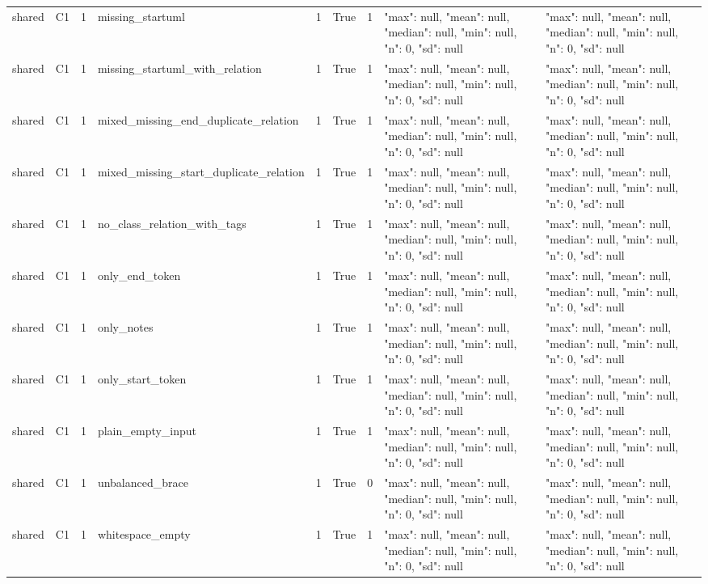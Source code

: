 \begin{tabular}{lllllllll}
shared & C1 & 1 & missing\_startuml & 1 & True & 1 & {"max": null, "mean": null, "median": null, "min": null, "n": 0, "sd": null} & {"max": null, "mean": null, "median": null, "min": null, "n": 0, "sd": null} \\
shared & C1 & 1 & missing\_startuml\_with\_relation & 1 & True & 1 & {"max": null, "mean": null, "median": null, "min": null, "n": 0, "sd": null} & {"max": null, "mean": null, "median": null, "min": null, "n": 0, "sd": null} \\
shared & C1 & 1 & mixed\_missing\_end\_duplicate\_relation & 1 & True & 1 & {"max": null, "mean": null, "median": null, "min": null, "n": 0, "sd": null} & {"max": null, "mean": null, "median": null, "min": null, "n": 0, "sd": null} \\
shared & C1 & 1 & mixed\_missing\_start\_duplicate\_relation & 1 & True & 1 & {"max": null, "mean": null, "median": null, "min": null, "n": 0, "sd": null} & {"max": null, "mean": null, "median": null, "min": null, "n": 0, "sd": null} \\
shared & C1 & 1 & no\_class\_relation\_with\_tags & 1 & True & 1 & {"max": null, "mean": null, "median": null, "min": null, "n": 0, "sd": null} & {"max": null, "mean": null, "median": null, "min": null, "n": 0, "sd": null} \\
shared & C1 & 1 & only\_end\_token & 1 & True & 1 & {"max": null, "mean": null, "median": null, "min": null, "n": 0, "sd": null} & {"max": null, "mean": null, "median": null, "min": null, "n": 0, "sd": null} \\
shared & C1 & 1 & only\_notes & 1 & True & 1 & {"max": null, "mean": null, "median": null, "min": null, "n": 0, "sd": null} & {"max": null, "mean": null, "median": null, "min": null, "n": 0, "sd": null} \\
shared & C1 & 1 & only\_start\_token & 1 & True & 1 & {"max": null, "mean": null, "median": null, "min": null, "n": 0, "sd": null} & {"max": null, "mean": null, "median": null, "min": null, "n": 0, "sd": null} \\
shared & C1 & 1 & plain\_empty\_input & 1 & True & 1 & {"max": null, "mean": null, "median": null, "min": null, "n": 0, "sd": null} & {"max": null, "mean": null, "median": null, "min": null, "n": 0, "sd": null} \\
shared & C1 & 1 & unbalanced\_brace & 1 & True & 0 & {"max": null, "mean": null, "median": null, "min": null, "n": 0, "sd": null} & {"max": null, "mean": null, "median": null, "min": null, "n": 0, "sd": null} \\
shared & C1 & 1 & whitespace\_empty & 1 & True & 1 & {"max": null, "mean": null, "median": null, "min": null, "n": 0, "sd": null} & {"max": null, "mean": null, "median": null, "min": null, "n": 0, "sd": null} \\

\end{tabular}
